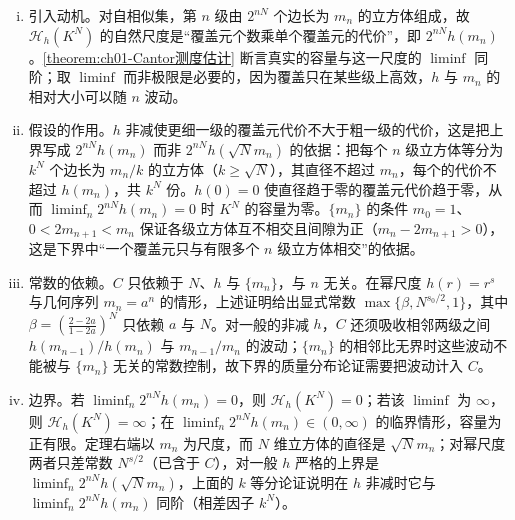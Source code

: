 \documentclass[../../main.tex]{subfiles}%
\begin{document}
\begin{remark}\label{remark:ch01-Cantor测度估计}
\begin{enumerate}[(i)]
\item 引入动机。对自相似集，第 $n$ 级由 $2^{nN}$ 个边长为 $m_n$ 的立方体组成，故 $\mathcal{H}_h(K^N)$ 的自然尺度是“覆盖元个数乘单个覆盖元的代价”，即 $2^{nN}h(m_n)$。\cref{theorem:ch01-Cantor测度估计} 断言真实的容量与这一尺度的 $\liminf$ 同阶；取 $\liminf$ 而非极限是必要的，因为覆盖只在某些级上高效，$h$ 与 $m_n$ 的相对大小可以随 $n$ 波动。
\item 假设的作用。$h$ 非减使更细一级的覆盖元代价不大于粗一级的代价，这是把上界写成 $2^{nN}h(m_n)$ 而非 $2^{nN}h(\sqrt Nm_n)$ 的依据：把每个 $n$ 级立方体等分为 $k^N$ 个边长为 $m_n/k$ 的立方体（$k\geqslant\sqrt N$），其直径不超过 $m_n$，每个的代价不超过 $h(m_n)$，共 $k^N$ 份。$h(0)=0$ 使直径趋于零的覆盖元代价趋于零，从而 $\liminf_n2^{nN}h(m_n)=0$ 时 $K^N$ 的容量为零。$\{m_n\}$ 的条件 $m_0=1$、$0<2m_{n+1}<m_n$ 保证各级立方体互不相交且间隙为正（$m_n-2m_{n+1}>0$），这是下界中“一个覆盖元只与有限多个 $n$ 级立方体相交”的依据。
\item 常数的依赖。$C$ 只依赖于 $N$、$h$ 与 $\{m_n\}$，与 $n$ 无关。在幂尺度 $h(r)=r^s$ 与几何序列 $m_n=a^n$ 的情形，上述证明给出显式常数 $\max\{\beta,N^{s_0/2},1\}$，其中 $\beta=\left(\frac{2-2a}{1-2a}\right)^N$ 只依赖 $a$ 与 $N$。对一般的非减 $h$，$C$ 还须吸收相邻两级之间 $h(m_{n-1})/h(m_n)$ 与 $m_{n-1}/m_n$ 的波动；$\{m_n\}$ 的相邻比无界时这些波动不能被与 $\{m_n\}$ 无关的常数控制，故下界的质量分布论证需要把波动计入 $C$。
\item 边界。若 $\liminf_n2^{nN}h(m_n)=0$，则 $\mathcal{H}_h(K^N)=0$；若该 $\liminf$ 为 $\infty$，则 $\mathcal{H}_h(K^N)=\infty$；在 $\liminf_n2^{nN}h(m_n)\in(0,\infty)$ 的临界情形，容量为正有限。定理右端以 $m_n$ 为尺度，而 $N$ 维立方体的直径是 $\sqrt Nm_n$；对幂尺度两者只差常数 $N^{s/2}$（已含于 $C$），对一般 $h$ 严格的上界是 $\liminf_n2^{nN}h(\sqrt Nm_n)$，上面的 $k$ 等分论证说明在 $h$ 非减时它与 $\liminf_n2^{nN}h(m_n)$ 同阶（相差因子 $k^N$）。
\end{enumerate}
\end{remark}
\end{document}
